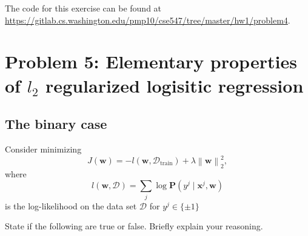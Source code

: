 \documentclass[letterpaper,11pt]{article}
\begin{document}
The code for this exercise can be found at \url{https://gitlab.cs.washington.edu/pmp10/cse547/tree/master/hw1/problem4}.

\section*{Problem 5: Elementary properties of $l_2$ regularized logisitic regression}

\subsection*{The binary case}

Consider minimizing
\begin{equation}
  J(\mathbf{w}) = -l\left(\mathbf{w},\mathcal{D}_\mathrm{train}\right) + \lambda\left\lVert\mathbf{w}\right\rVert_2^2,
\end{equation}
where
\begin{equation}
  l\left(\mathbf{w},\mathcal{D}\right) = \sum_j \log \mathbf{P}\left(
    y^j \mid \mathbf{x}^j, \mathbf{w}
  \right)
\end{equation}
is the log-likelihood on the data set $\mathcal{D}$ for
$y^j \in \{ \pm 1 \}$

State if the following are true or false. Briefly explain your reasoning.
\end{document}
